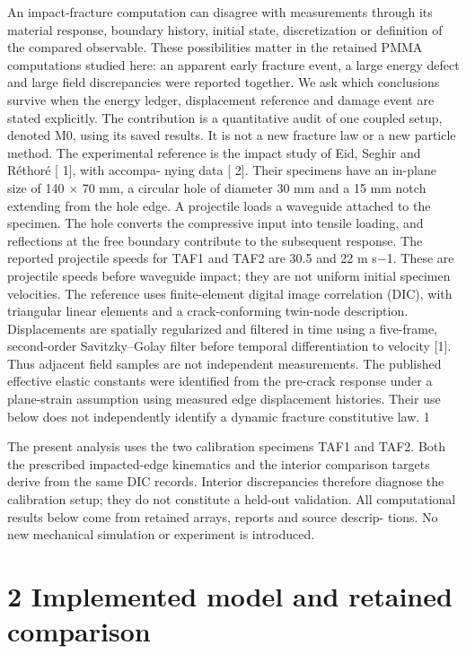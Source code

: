 \documentclass[11pt]{article}
\begin{document}
An impact-fracture computation can disagree with measurements through its material response,
boundary history, initial state, discretization or definition of the compared observable. These
possibilities matter in the retained PMMA computations studied here: an apparent early fracture
event, a large energy defect and large field discrepancies were reported together. We ask which
conclusions survive when the energy ledger, displacement reference and damage event are stated
explicitly. The contribution is a quantitative audit of one coupled setup, denoted M0, using its
saved results. It is not a new fracture law or a new particle method.
The experimental reference is the impact study of Eid, Seghir and Réthoré [ 1], with accompa-
nying data [ 2]. Their specimens have an in-plane size of 140 \ensuremath{\times} 70 mm, a circular hole of diameter
30 mm and a 15 mm notch extending from the hole edge. A projectile loads a waveguide attached
to the specimen. The hole converts the compressive input into tensile loading, and reflections at
the free boundary contribute to the subsequent response. The reported projectile speeds for TAF1
and TAF2 are 30.5 and 22 m s\ensuremath{-}1. These are projectile speeds before waveguide impact; they are
not uniform initial specimen velocities.
The reference uses finite-element digital image correlation (DIC), with triangular linear elements
and a crack-conforming twin-node description. Displacements are spatially regularized and filtered
in time using a five-frame, second-order Savitzky–Golay filter before temporal differentiation to
velocity [1]. Thus adjacent field samples are not independent measurements. The published effective
elastic constants were identified from the pre-crack response under a plane-strain assumption using
measured edge displacement histories. Their use below does not independently identify a dynamic
fracture constitutive law.
1

The present analysis uses the two calibration specimens TAF1 and TAF2. Both the prescribed
impacted-edge kinematics and the interior comparison targets derive from the same DIC records.
Interior discrepancies therefore diagnose the calibration setup; they do not constitute a held-out
validation. All computational results below come from retained arrays, reports and source descrip-
tions. No new mechanical simulation or experiment is introduced.

\section*{2 Implemented model and retained comparison}
\end{document}
